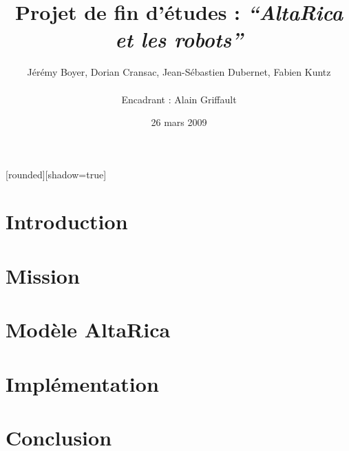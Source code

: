 \documentclass[8pt]{beamer}
\begin{document}

[rounded][shadow=true]

\author[J. Boyer, D. Cransac, J-S. Dubernet, F. Kuntz - Encadrant :
A. Griffault]{Jérémy Boyer, Dorian Cransac, Jean-Sébastien Dubernet,
Fabien Kuntz\\
~\\
\small Encadrant : Alain Griffault}
\title{Projet de fin d'études : \textit{``AltaRica et les robots''}} 
\date{\footnotesize 26 mars 2009}

\setcounter{page}{1}

\frame{\titlepage}
\frame{\tableofcontents}

 \section{Introduction}
 \frame{\tableofcontents[current]}
 

 \section{Mission}
 \frame{\tableofcontents[current]}

 \section{Modèle AltaRica}
 \frame{\tableofcontents[current]}
 
  
 \section{Implémentation}
 \frame{\tableofcontents[current]}
 

 \section{Conclusion}
 \frame{\tableofcontents[current]}


\end{document}
